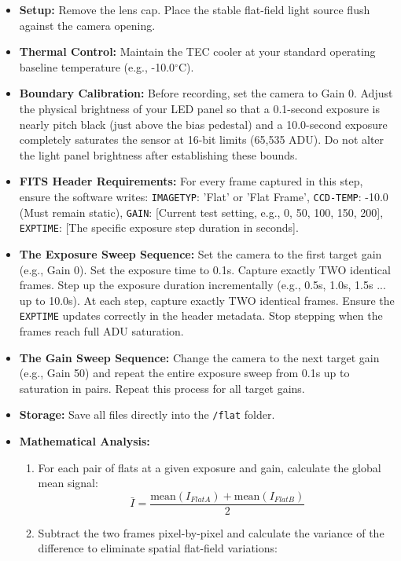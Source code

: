 \documentclass[11pt,a4paper]{article}
\begin{document}
\begin{itemize}[leftmargin=*]
    \item \textbf{Setup:} Remove the lens cap. Place the stable flat-field light source flush against the camera opening.
    \item \textbf{Thermal Control:} Maintain the TEC cooler at your standard operating baseline temperature (e.g., -10.0$^\circ$C).
    \item \textbf{Boundary Calibration:} Before recording, set the camera to Gain 0. Adjust the physical brightness of your LED panel so that a 0.1-second exposure is nearly pitch black (just above the bias pedestal) and a 10.0-second exposure completely saturates the sensor at 16-bit limits (65,535 ADU). Do not alter the light panel brightness after establishing these bounds.
    \item \textbf{FITS Header Requirements:} For every frame captured in this step, ensure the software writes: \texttt{IMAGETYP}: 'Flat' or 'Flat Frame', \texttt{CCD-TEMP}: -10.0 (Must remain static), \texttt{GAIN}: [Current test setting, e.g., 0, 50, 100, 150, 200], \texttt{EXPTIME}: [The specific exposure step duration in seconds].
    \item \textbf{The Exposure Sweep Sequence:} Set the camera to the first target gain (e.g., Gain 0). Set the exposure time to 0.1s. Capture exactly TWO identical frames. Step up the exposure duration incrementally (e.g., 0.5s, 1.0s, 1.5s ... up to 10.0s). At each step, capture exactly TWO identical frames. Ensure the \texttt{EXPTIME} updates correctly in the header metadata. Stop stepping when the frames reach full ADU saturation.
    \item \textbf{The Gain Sweep Sequence:} Change the camera to the next target gain (e.g., Gain 50) and repeat the entire exposure sweep from 0.1s up to saturation in pairs. Repeat this process for all target gains.
    \item \textbf{Storage:} Save all files directly into the \texttt{/flat} folder.
    \item \textbf{Mathematical Analysis:}
        \begin{enumerate}
            \item For each pair of flats at a given exposure and gain, calculate the global mean signal: 
            $$ \bar{I} = \frac{\text{mean}(I_{FlatA}) + \text{mean}(I_{FlatB})}{2} $$
            \item Subtract the two frames pixel-by-pixel and calculate the variance of the difference to eliminate spatial flat-field variations: 

\end{enumerate}
\end{itemize}
\end{document}
